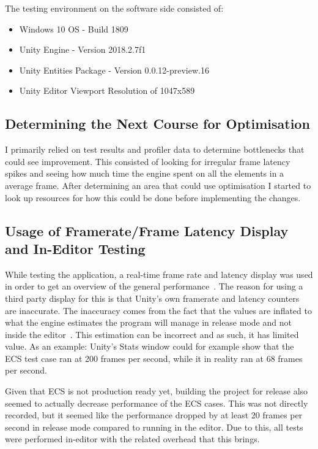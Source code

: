 The testing environment on the software side consisted of:
\begin{itemize}
    \item Windows 10 OS - Build 1809
    \item Unity Engine - Version 2018.2.7f1
    \item Unity Entities Package - Version 0.0.12-preview.16
    \item Unity Editor Viewport Resolution of 1047x589
\end{itemize}

\subsection{Determining the Next Course for Optimisation}
I primarily relied on test results and profiler data to determine bottlenecks that could see improvement. This consisted of looking for irregular frame latency spikes and seeing how much time the engine spent on all the elements in a average frame. After determining an area that could use optimisation I started to look up resources for how this could be done before implementing the changes. 

\subsection{Usage of Framerate/Frame Latency Display and In-Editor Testing}
While testing the application, a real-time frame rate and latency display was used in order to get an overview of the general performance~\cite{graphy}. The reason for using a third party display for this is that Unity's own framerate and latency counters are inaccurate. The inaccuracy comes from the fact that the values are inflated to what the engine estimates the program will manage in release mode and not inside the editor~\cite{forumFramerateStats}. This estimation can be incorrect and as such, it has limited value. As an example: Unity's Stats window could for example show that the ECS test case ran at 200 frames per second, while it in reality ran at 68 frames per second. 

Given that ECS is not production ready yet, building the project for release also seemed to actually decrease performance of the ECS cases. This was not directly recorded, but it seemed like the performance dropped by at least 20 frames per second in release mode compared to running in the editor. Due to this, all tests were performed in-editor with the related overhead that this brings. 